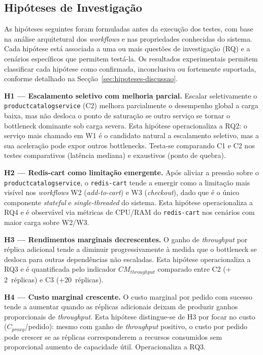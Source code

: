\documentclass[manuscript,screen,review]{acmart}
\begin{document}
\subsection{Hipóteses de Investigação}
\label{subsec:hipoteses}

As hipóteses seguintes foram formuladas antes da execução dos testes, com base na análise arquitetural dos \textit{workflows} e nas propriedades conhecidas do sistema. Cada hipótese está associada a uma ou mais questões de investigação (RQ) e a cenários específicos que permitem testá-la. Os resultados experimentais permitem classificar cada hipótese como confirmada, inconclusiva ou fortemente suportada, conforme detalhado na Secção~\ref{sec:hipoteses-discussao}.

\textbf{H1 — Escalamento seletivo com melhoria parcial.} Escalar seletivamente o \texttt{productcatalogservice} (C2) melhora parcialmente o desempenho global a carga baixa, mas não desloca o ponto de saturação se outro serviço se tornar o bottleneck dominante sob carga severa. Esta hipótese operacionaliza a RQ2: o serviço mais chamado em W1 é o candidato natural a escalamento seletivo, mas a sua aceleração pode expor outros bottlenecks. Testa-se comparando C1 e C2 nos testes comparativos (latência mediana) e exaustivos (ponto de quebra).

\textbf{H2 — Redis-cart como limitação emergente.} Após aliviar a pressão sobre o \texttt{productcatalogservice}, o \texttt{redis-cart} tende a emergir como a limitação mais visível nos \textit{workflows} W2 (\textit{add-to-cart}) e W3 (\textit{checkout}), dado que é o único componente \textit{stateful} e \textit{single-threaded} do sistema. Esta hipótese operacionaliza a RQ4 e é observável via métricas de CPU/RAM do \texttt{redis-cart} nos cenários com maior carga sobre W2/W3.

\textbf{H3 — Rendimentos marginais decrescentes.} O ganho de \textit{throughput} por réplica adicional tende a diminuir progressivamente à medida que o bottleneck se desloca para outras dependências não escaladas. Esta hipótese operacionaliza a RQ3 e é quantificada pelo indicador $CM_{throughput}$ comparado entre C2 ($+$2~réplicas) e C3 ($+$20~réplicas).

\textbf{H4 — Custo marginal crescente.} O custo marginal por pedido com sucesso tende a aumentar quando as réplicas adicionais deixam de produzir ganhos proporcionais de \textit{throughput}. Esta hipótese distingue-se de H3 por focar no custo ($C_{proxy}$/pedido): mesmo com ganho de \textit{throughput} positivo, o custo por pedido pode crescer se as réplicas corresponderem a recursos consumidos sem proporcional aumento de capacidade útil. Operacionaliza a RQ3.
\end{document}
